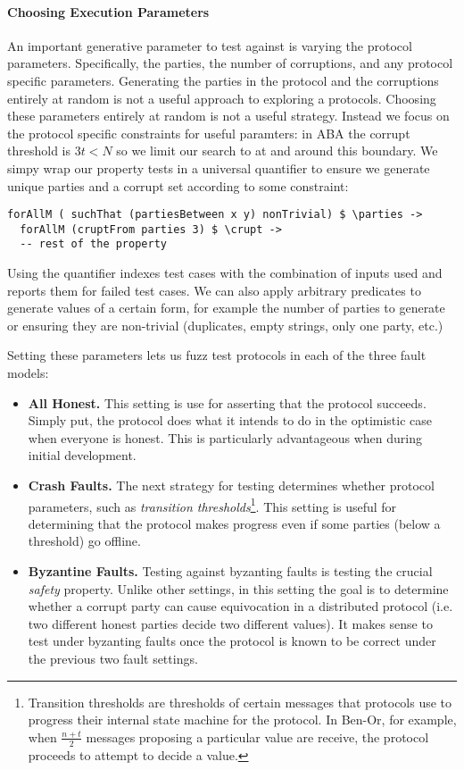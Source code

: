 \paragraph{Choosing Execution Parameters}
An important generative parameter to test against is varying the protocol parameters. Specifically, the parties, the number of corruptions, and any protocol specific parameters.
Generating the parties in the protocol and the corruptions entirely at random is not a useful approach to exploring a protocols.
Choosing these parameters entirely at random is not a useful strategy.
Instead we focus on the protocol specific constraints for useful paramters: in ABA the corrupt threshold is $3t < N$ so we limit our search to at and around this boundary.
We simpy wrap our property tests in a universal quantifier to ensure we generate unique parties and a corrupt set according to some constraint:
\begin{lstlisting}
forAllM ( suchThat (partiesBetween x y) nonTrivial) $ \parties -> 
  forAllM (cruptFrom parties 3) $ \crupt ->
  -- rest of the property
\end{lstlisting}
Using the  quantifier indexes test cases with the combination of inputs used and reports them for failed test cases.
We can also apply arbitrary predicates to generate values of a certain form, for example the number of parties to generate or ensuring they are non-trivial (duplicates, empty strings, only one party, etc.)

Setting these parameters lets us fuzz test protocols in each of the three fault models:
\begin{itemize}
  \item \textbf{All Honest.} This setting is use for asserting that the protocol succeeds. Simply put, the protocol does what it intends to do in the optimistic case when everyone is honest. This is particularly advantageous when during initial development. 
  \item \textbf{Crash Faults.} The next strategy for testing determines whether protocol parameters, such as \emph{transition thresholds}\footnote{Transition thresholds are thresholds of certain messages that protocols use to progress their internal state machine for the protocol. In Ben-Or, for example, when $\frac{n+t}{2}$ messages proposing a particular value are receive, the protocol proceeds to attempt to decide a value.}. This setting is useful for determining that the protocol makes progress even if some parties (below a threshold) go offline.
  \item \textbf{Byzantine Faults.} Testing against byzanting faults is testing the crucial \emph{safety} property. Unlike other settings, in this setting the goal is to determine whether a corrupt party can cause equivocation in a distributed protocol (i.e. two different honest parties decide two different values). It makes sense to test under byzanting faults once the protocol is known to be correct under the previous two fault settings. 
\end{itemize}

